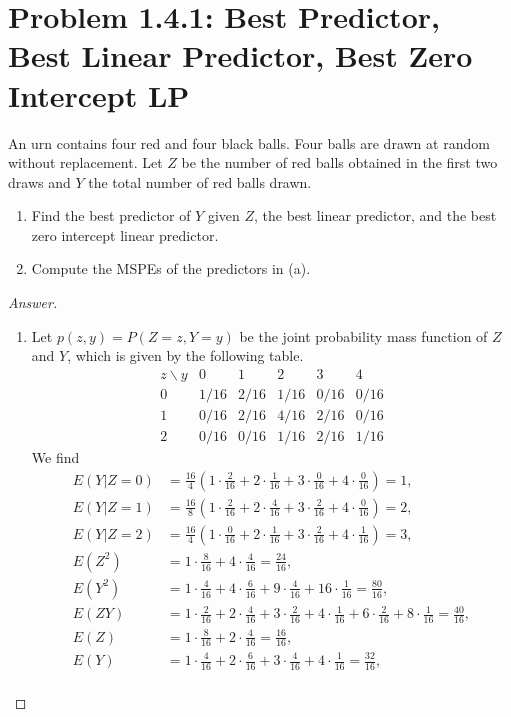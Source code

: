 \documentclass{amsbook}
\theoremstyle{definition}
\theoremstyle{remark}
\numberwithin{section}{chapter}
\numberwithin{equation}{chapter}
\begin{document}
\section{Problem 1.4.1: Best Predictor, Best Linear Predictor, Best Zero Intercept LP}
An urn contains four red and four black balls. Four balls are drawn at random without replacement. Let $Z$ be the number of red balls obtained in the first two draws and $Y$ the total number of red balls drawn.
\begin{enumerate}[label=(\alph*)]
\item Find the best predictor of $Y$ given $Z$, the best linear predictor, and the best zero intercept linear predictor.
\item Compute the MSPEs of the predictors in (a).
\end{enumerate}
\begin{proof}[Answer]
\begin{enumerate}[label=(\alph*)]
\item Let $p(z,y)=P(Z = z,Y = y)$ be the joint probability mass function of $Z$ and $Y$, which is given by the following table.\[
\begin{array}{c|c|c|c|c|c}
z\backslash y&0&1&2&3&4\\\hline
0&1/16&2/16&1/16&0/16&0/16\\\hline
1&0/16&2/16&4/16&2/16&0/16\\\hline
2&0/16&0/16&1/16&2/16&1/16
\end{array}
\]We find\[
\begin{split}
E(Y|Z=0)&=\frac{16}{4}(1\cdot\frac{2}{16}+2\cdot\frac{1}{16}+3\cdot\frac{0}{16}+4\cdot\frac{0}{16})=1,\\
E(Y|Z=1)&=\frac{16}{8}(1\cdot\frac{2}{16}+2\cdot\frac{4}{16}+3\cdot\frac{2}{16}+4\cdot\frac{0}{16})=2,\\
E(Y|Z=2)&=\frac{16}{4}(1\cdot\frac{0}{16}+2\cdot\frac{1}{16}+3\cdot\frac{2}{16}+4\cdot\frac{1}{16})=3,\\
E(Z^2)&=1\cdot\frac{8}{16}+4\cdot\frac{4}{16}=\frac{24}{16},\\
E(Y^2)&=1\cdot\frac{4}{16}+4\cdot\frac{6}{16}+9\cdot\frac{4}{16}+16\cdot\frac{1}{16}=\frac{80}{16},\\
E(ZY)&=1\cdot\frac{2}{16}+2\cdot\frac{4}{16}+3\cdot\frac{2}{16}+4\cdot\frac{1}{16}+6\cdot\frac{2}{16}+8\cdot\frac{1}{16}=\frac{40}{16},\\
E(Z)&=1\cdot\frac{8}{16}+2\cdot\frac{4}{16}=\frac{16}{16},\\
E(Y)&=1\cdot\frac{4}{16}+2\cdot\frac{6}{16}+3\cdot\frac{4}{16}+4\cdot\frac{1}{16}=\frac{32}{16},\\

\end{split}\]
\end{enumerate}
\end{proof}
\end{document}
